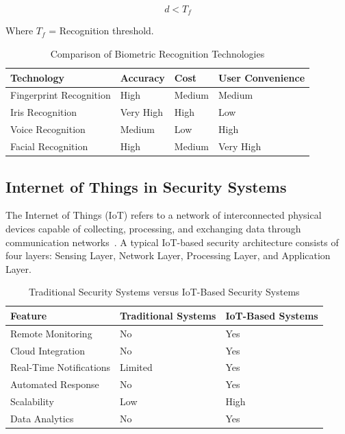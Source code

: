 \documentclass[12pt,a4paper,oneside]{report}
\begin{document}
\begin{equation}
  d < T_f
\end{equation}

Where $T_f$ = Recognition threshold.

\begin{table}[htbp]
  \centering
  \caption{Comparison of Biometric Recognition Technologies}
  {\small
  \begin{tabular}{|p{5.00cm}|p{2.50cm}|p{2.50cm}|p{4.00cm}|}
    \hline
    \textbf{Technology} & \textbf{Accuracy} & \textbf{Cost} & \textbf{User Convenience} \\
    \hline
    Fingerprint Recognition & High      & Medium & Medium \\
    Iris Recognition        & Very High & High   & Low \\
    Voice Recognition       & Medium    & Low    & High \\
    Facial Recognition      & High      & Medium & Very High \\
    \hline
  \end{tabular}
  }
\end{table}

\subsection{Internet of Things in Security Systems}

The Internet of Things (IoT) refers to a network of interconnected physical devices capable of collecting, processing, and exchanging data through communication networks~\cite{ref1,ref19}. A typical IoT-based security architecture consists of four layers: Sensing Layer, Network Layer, Processing Layer, and Application Layer.

\begin{table}[htbp]
  \centering
  \caption{Traditional Security Systems versus IoT-Based Security Systems}
  {\small
  \begin{tabular}{|p{5.00cm}|p{3.50cm}|p{3.50cm}|}
    \hline
    \textbf{Feature} & \textbf{Traditional Systems} & \textbf{IoT-Based Systems} \\
    \hline
    Remote Monitoring        & No      & Yes \\
    Cloud Integration        & No      & Yes \\
    Real-Time Notifications  & Limited & Yes \\
    Automated Response       & No      & Yes \\
    Scalability              & Low     & High \\
    Data Analytics           & No      & Yes \\
    \hline
  \end{tabular}
  }
\end{table}
\end{document}
